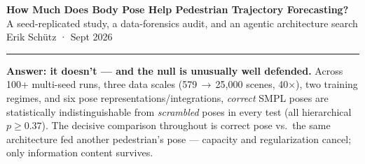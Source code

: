 \documentclass[9pt,a4paper]{extarticle}
\begin{document}
{\LARGE\bfseries\color{navy} How Much Does Body Pose Help Pedestrian Trajectory Forecasting?}\\[2pt]
{\large A seed-replicated study, a data-forensics audit, and an agentic architecture search \hfill \normalsize Erik Sch\"utz · Sept 2026}
\vspace{2pt}\hrule\vspace{6pt}

\textbf{Answer: it doesn't --- and the null is unusually well defended.} Across 100+ multi-seed runs, three data scales (579\,$\to$\,25{,}000 scenes, 40$\times$), two training regimes, and six pose representations/integrations, \emph{correct} SMPL poses are statistically indistinguishable from \emph{scrambled} poses in every test (all hierarchical $p\geq0.37$). The decisive comparison throughout is correct pose vs.\ the same architecture fed another pedestrian's pose --- capacity and regularization cancel; only information content survives.
\end{document}
